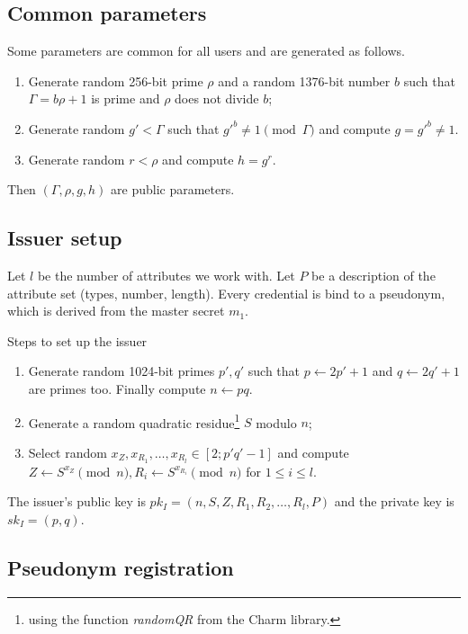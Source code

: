 \documentclass[a4paper]{article}
\begin{document}
\subsection{Common parameters}

Some parameters are common for all users and are generated as follows.
\begin{enumerate}
\item Generate random 256-bit prime $\rho$ and a random 1376-bit number $b$ such that
$\Gamma = b\rho+1$ is prime and $\rho$ does not divide $b$;
\item Generate random $g'< \Gamma$ such that
$g'^{b}\neq 1\pmod{\Gamma}$ and compute $g = g'^{b}\neq 1$.
\item Generate random $r<\rho$ and compute $h = g^r$.
\end{enumerate}
Then $(\Gamma,\rho,g,h)$ are public parameters.

\subsection{Issuer setup}\label{sec:iss-setup}

Let $l$ be the number of attributes we work with.  Let $P$ be a description of the 
attribute set (types, number, length).  Every credential is bind to a pseudonym, which is derived from the master secret
$m_1$.


Steps to set up the issuer
\begin{enumerate}
\item Generate random 1024-bit primes $p',q'$ such that  $p \leftarrow 2p'+1$ and $q \leftarrow 2q'+1$ are primes too. Finally compute $n \leftarrow pq$.
    \item Generate a random quadratic residue\footnote{using the function \textsl{randomQR} from the Charm library.} $S$ modulo $n$;
    \item Select random $x_Z, x_{R_1},\ldots , x_{R_l}\in [2; p'q'-1]$ and
compute $Z \leftarrow S^{x_Z}\pmod{n} , R_i \leftarrow S^{x_{R_i}}\pmod{n}$ for $1\leq i \leq l$.
\end{enumerate}
The issuer's public key is $pk_I = (n, S,Z,R_1,R_2,\ldots,R_l,P)$ and the private key is $sk_I = (p, q)$.

\subsection{Pseudonym registration}
\end{document}
